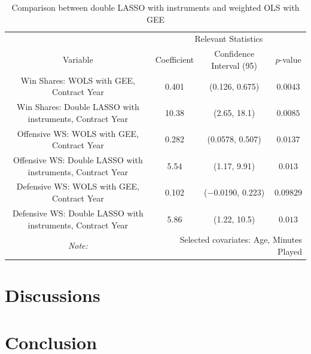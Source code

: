\documentclass[12pt]{article}
\begin{document}
	\begin{landscape}
		\begin{table}[!htbp]
			\centering
			\caption{Comparison between double LASSO with instruments and weighted OLS with GEE}
			\label{lassoivvsgee} 
			\begin{tabular}{*4c}
				\toprule
				& \multicolumn{3}{c}{Relevant Statistics} \\
				\cmidrule(lr){2-4}
				Variable & Coefficient  & Confidence Interval (95) & $p$-value \\
				\midrule
				Win Shares: WOLS with GEE, Contract Year & 0.401       & (0.126, 0.675) & $0.0043$       \\
				Win Shares: Double LASSO with instruments, Contract Year & 10.38       & (2.65, 18.1) & $0.0085$       \\
				Offensive WS: WOLS with GEE, Contract Year & 0.282       & (0.0578, 0.507) & $0.0137$       \\
				Offensive WS: Double LASSO with instruments, Contract Year & 5.54       & (1.17, 9.91) & $0.013$       \\
				Defensive WS: WOLS with GEE, Contract Year & 0.102       & ($-$0.0190, 0.223) & $0.09829$       \\
				Defensive WS: Double LASSO with instruments, Contract Year & 5.86       & (1.22, 10.5) & $0.013$       \\
				\bottomrule
				\textit{Note:}  & \multicolumn{3}{r}{Selected covariates: Age, Minutes Played} \\
			\end{tabular}
		\end{table}
	\end{landscape}
	
	\pagebreak
	
	\section{Discussions} \label{sec:discussion}
	
	\section{Conclusion} \label{sec:conclusion}
	
\end{document}
